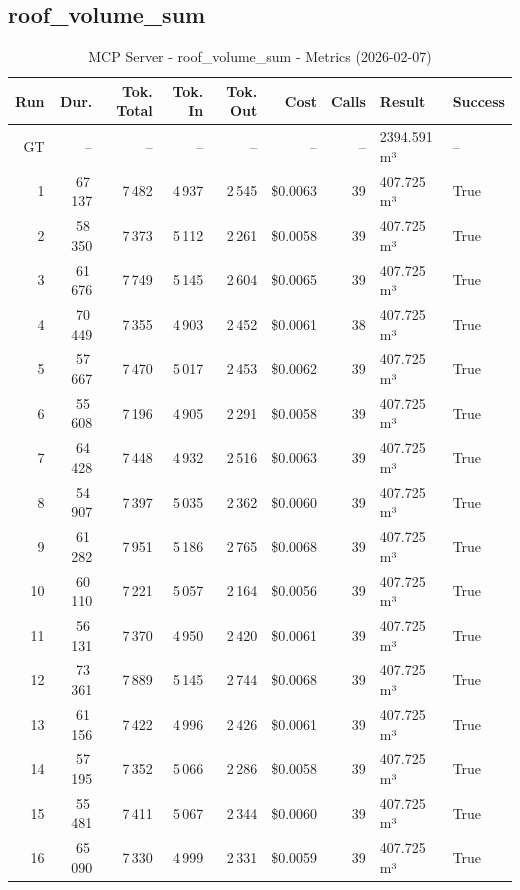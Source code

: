 \documentclass[a4paper,11pt]{article}
\begin{document}
\clearpage
\subsection{roof\_volume\_sum}

\begin{table}[ht]
\centering
\scriptsize
\caption{MCP Server - roof\_volume\_sum - Metrics (2026-02-07)}
\label{tab:mcp\_roof\_volume\_sum\_metrics\_2026-02-07}
\begin{tabular}{r r r r r r r p{3cm} l}
\hline
Run & Dur. & Tok. Total & Tok. In & Tok. Out & Cost & Calls & Result & Success \\
\hline
GT & -- & -- & -- & -- & -- & -- & 2394.591 m³ & -- \\
1 & 67\,137 & 7\,482 & 4\,937 & 2\,545 & \$0.0063 & 39 & 407.725 m³ & True \\
2 & 58\,350 & 7\,373 & 5\,112 & 2\,261 & \$0.0058 & 39 & 407.725 m³ & True \\
3 & 61\,676 & 7\,749 & 5\,145 & 2\,604 & \$0.0065 & 39 & 407.725 m³ & True \\
4 & 70\,449 & 7\,355 & 4\,903 & 2\,452 & \$0.0061 & 38 & 407.725 m³ & True \\
5 & 57\,667 & 7\,470 & 5\,017 & 2\,453 & \$0.0062 & 39 & 407.725 m³ & True \\
6 & 55\,608 & 7\,196 & 4\,905 & 2\,291 & \$0.0058 & 39 & 407.725 m³ & True \\
7 & 64\,428 & 7\,448 & 4\,932 & 2\,516 & \$0.0063 & 39 & 407.725 m³ & True \\
8 & 54\,907 & 7\,397 & 5\,035 & 2\,362 & \$0.0060 & 39 & 407.725 m³ & True \\
9 & 61\,282 & 7\,951 & 5\,186 & 2\,765 & \$0.0068 & 39 & 407.725 m³ & True \\
10 & 60\,110 & 7\,221 & 5\,057 & 2\,164 & \$0.0056 & 39 & 407.725 m³ & True \\
11 & 56\,131 & 7\,370 & 4\,950 & 2\,420 & \$0.0061 & 39 & 407.725 m³ & True \\
12 & 73\,361 & 7\,889 & 5\,145 & 2\,744 & \$0.0068 & 39 & 407.725 m³ & True \\
13 & 61\,156 & 7\,422 & 4\,996 & 2\,426 & \$0.0061 & 39 & 407.725 m³ & True \\
14 & 57\,195 & 7\,352 & 5\,066 & 2\,286 & \$0.0058 & 39 & 407.725 m³ & True \\
15 & 55\,481 & 7\,411 & 5\,067 & 2\,344 & \$0.0060 & 39 & 407.725 m³ & True \\
16 & 65\,090 & 7\,330 & 4\,999 & 2\,331 & \$0.0059 & 39 & 407.725 m³ & True \\

\end{tabular}
\end{table}
\end{document}
